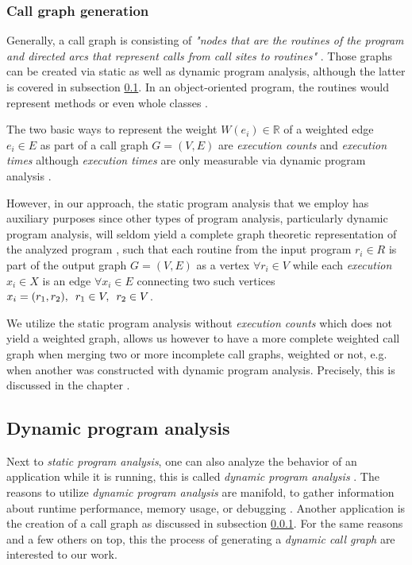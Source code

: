 \documentclass[12pt,a4paper]{report}
\begin{document}
\subsubsection{Call graph generation} \label{subsubsect:call-graph-static}
Generally, a call graph is consisting of \textit{"nodes that are the routines
of the program and directed arcs that represent calls from call sites to
routines"} \cite{graham1982gprof}. Those graphs can be created via static
as well as dynamic program analysis, although the latter is covered in
subsection \ref{subsect:background-dynamic-analysis}.
In an object-oriented program, the routines would represent methods
or even whole classes \cite{grove1997callgraph}.

The two basic ways to represent the weight \(W(e_i) \in \mathbb{R}\)
of a weighted edge \(e_i \in E\) as part of a call graph \(G = (V, E)\)
are \textit{execution counts} and \textit{execution times} although
\textit{execution times} are only measurable via
dynamic program analysis \cite{graham1982gprof}.

However, in our approach, the static program analysis that we employ has
auxiliary purposes since other types of program analysis, particularly
dynamic program analysis, will seldom yield a complete graph theoretic
representation of the analyzed program \cite{graham1982gprof}, such that
each routine from the input program \(r_i \in R\) is part of the output graph
\(G = (V, E)\) as a vertex \(\forall r_i \in V\) while each \textit{execution}
\(x_i \in X\) is an edge \(\forall x_i \in E\) connecting
two such vertices \(x_i = (r_1, r_2), \enskip r_1 \in V, \enskip r_2 \in V\).

We utilize the static program analysis without \textit{execution counts}
which does not yield a weighted graph, allows us however to have a more complete
weighted call graph when merging two or more incomplete call graphs,
weighted or not, e.g. when another was constructed with dynamic program analysis.
Precisely, this is discussed in the chapter \textit{}.


\subsection{Dynamic program analysis} \label{subsect:background-dynamic-analysis}

Next to \textit{static program analysis}, one can also analyze the behavior of
an application while it is running, this is called
\textit{dynamic program analysis} \cite{ernst2003static}.
The reasons to utilize \textit{dynamic program analysis} are manifold,
to gather information about runtime performance, memory usage,
or debugging \cite{ernst2003static}.
Another application is the creation of a call graph as discussed in subsection
\ref{subsubsect:call-graph-static}. For the same reasons and a few others on top,
this the process of generating a \textit{dynamic call graph} are interested to our work.
\end{document}
